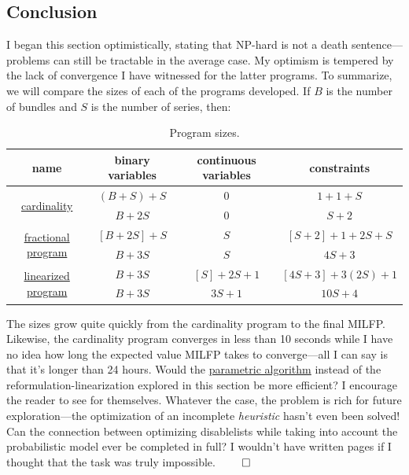 \documentclass[11pt, oneside]{article}
\theoremstyle{plain}
\theoremstyle{definition}
\begin{document}
\subsection{Conclusion}
I began this section optimistically, stating that NP-hard is not a death
sentence---problems can still be tractable in the average case. My optimism is
tempered by the lack of convergence I have witnessed for the latter programs.
To summarize, we will compare the sizes of each of the programs developed. If
\( B \) is the number of bundles and \( S \) is the number of series, then:
\begin{table}[h!]
  \centering
  \begin{tabular}{|c|c|c|c|}
    \hline
    name & binary variables & continuous variables & constraints \\
    \hline \hline
    \multirow{2}{5em}{\hyperref[eq:char]{cardinality}}
    & \( (B + S) + S \) & 0 & \( 1 + 1 + S \) \\
    & \( B + 2S \) & 0 & \( S + 2 \) \\
    \hline
    \multirow{2}{5em}{\hyperref[eq:expected_value]{fractional program}}
    & \( [B + 2S] + S \) & \( S \) & \( [S + 2] + 1 + 2S + S \) \\
    & \( B + 3S \) & \( S \) & \( 4S + 3 \) \\
    \hline
    \multirow{2}{5em}{\hyperref[eq:milfp]{linearized program}}
    & \( B + 3S \) & \( [S] + 2S + 1 \) & \( [4S + 3] + 3(2S) + 1 \) \\
    & \( B + 3S \) & \( 3S + 1 \) & \( 10S + 4 \) \\
    \hline
  \end{tabular}
  \caption{Program sizes.}
\end{table}

The sizes grow quite quickly from the cardinality program to the final MILFP.
Likewise, the cardinality program converges in less than 10 seconds while I
have no idea how long the expected value MILFP takes to converge---all I can
say is that it's longer than 24 hours. Would the
\href{https://optimization.mccormick.northwestern.edu/index.php/Mixed-integer_linear_fractional_programming_(MILFP)}
{parametric algorithm} instead of the reformulation-linearization
explored in this section be more efficient? I encourage the reader to
see for themselves. Whatever the case, the problem is rich for future
exploration---the optimization of an incomplete \textit{heuristic} hasn't
even been solved! Can the connection between optimizing disablelists
while taking into account the probabilistic model ever be completed in
full? I wouldn't have written \pageref{here2} pages if I thought that
the task was truly impossible. \( \qed \)
\end{document}

